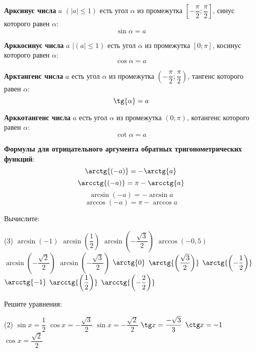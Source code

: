 \begin{class}[number=3]
	\begin{definit}
		\textbf{Арксинус числа} \(a \) \((|a| \le 1) \) есть угол \( \alpha \) из промежутка \(\left[ -\dfrac{\pi}{2};\dfrac{\pi}{2} \right]\), синус которого равен \( \alpha \): \[ \sin{\alpha}=a \]
	\end{definit}
	\begin{definit}
		\textbf{Арккосинус числа} \(a \) \(|(a| \le 1) \) есть угол \( \alpha \) из промежутка \([0; \pi]\), косинус которого равен \( \alpha \): \[ \cos{\alpha}=a \]
	\end{definit}
	\begin{definit}
		\textbf{Арктангенс числа} \(a \) есть угол \( \alpha \) из промежутка \(\left( -\dfrac{\pi}{2};\dfrac{\pi}{2} \right)\), тангенс которого равен \( \alpha \): \[ \tg{\alpha}=a \]
	\end{definit}
	\begin{definit}
		\textbf{Арккотангенс числа} \(a \) есть угол \( \alpha \) из промежутка \((0; \pi)\), котангенс которого равен \( \alpha \): \[ \cot{\alpha}=a \]
	\end{definit}
	\textbf{Формулы для отрицательного аргумента обратных тригонометрических функций}:
	\[ \arctg{(-a)}=-\arctg{a} \]
	\[ \arcctg{(-a)}=\pi-\arcctg{a} \]
	\[ \arcsin{(-a)}=-\arcsin{a} \]
	\[ \arccos{(-a)}=\pi-\arccos{a} \]
	\begin{listofex}
		\item Вычислите:
		\begin{tasks}(3)
			\task \( \arcsin{(-1)} \)
			\task \( \arcsin{\left( \dfrac{1}{2} \right)} \)
			\task \( \arcsin{\left( -\dfrac{\sqrt{3}}{2} \right)} \)
			\task \( \arccos{(-0,5)} \)
			\task \( \arcsin{\left( -\dfrac{\sqrt{2}}{2} \right)} \)
			\task \( \arcsin{\left( -\dfrac{\sqrt{3}}{2} \right)} \)
			\task \( \arctg{0} \)
			\task \( \arctg{\left( \dfrac{\sqrt{3}}{2} \right)} \)
			\task \( \arctg{\left( -\dfrac{1}{2} \right)} \)
			\task \( \arcctg{-1} \)
			\task \( \arcctg{\left( \dfrac{1}{2} \right)} \)
			\task \( \arcctg{\left( -\dfrac{2}{2} \right)} \)
		\end{tasks}
		\newpage
		\item Решите уравнения:
		\begin{tasks}(2)
			\task \( \sin x=\dfrac{1}{2} \)
			\task \( \cos x=-\dfrac{\sqrt{3}}{2} \)
			\task \( \sin x = -\dfrac{\sqrt{2}}{2} \)
			\task \( \tg x = \dfrac{-\sqrt{3}}{3} \)
			\task \( \ctg x = -1 \)
			\task \( \cos x = \dfrac{\sqrt{2}}{2} \)

\end{tasks}
\end{listofex}
\end{class}
